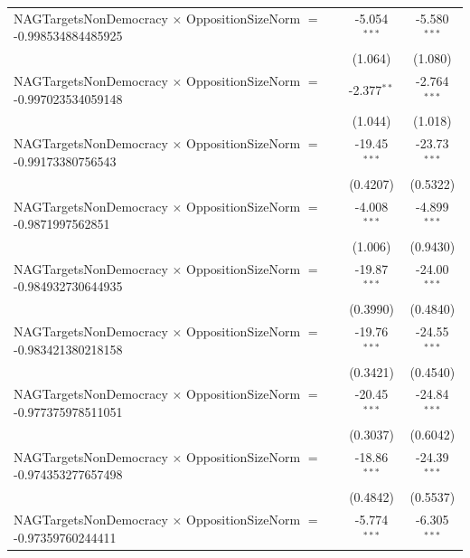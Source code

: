 \begin{tabular}{lcc}
   NAGTargetsNonDemocracy $\times$ OppositionSizeNorm $=$ -0.998534884485925    & -5.054$^{***}$       & -5.580$^{***}$\\   
                                                                                & (1.064)              & (1.080)\\   
   NAGTargetsNonDemocracy $\times$ OppositionSizeNorm $=$ -0.997023534059148    & -2.377$^{**}$        & -2.764$^{***}$\\   
                                                                                & (1.044)              & (1.018)\\   
   NAGTargetsNonDemocracy $\times$ OppositionSizeNorm $=$ -0.99173380756543     & -19.45$^{***}$       & -23.73$^{***}$\\   
                                                                                & (0.4207)             & (0.5322)\\   
   NAGTargetsNonDemocracy $\times$ OppositionSizeNorm $=$ -0.9871997562851      & -4.008$^{***}$       & -4.899$^{***}$\\   
                                                                                & (1.006)              & (0.9430)\\   
   NAGTargetsNonDemocracy $\times$ OppositionSizeNorm $=$ -0.984932730644935    & -19.87$^{***}$       & -24.00$^{***}$\\   
                                                                                & (0.3990)             & (0.4840)\\   
   NAGTargetsNonDemocracy $\times$ OppositionSizeNorm $=$ -0.983421380218158    & -19.76$^{***}$       & -24.55$^{***}$\\   
                                                                                & (0.3421)             & (0.4540)\\   
   NAGTargetsNonDemocracy $\times$ OppositionSizeNorm $=$ -0.977375978511051    & -20.45$^{***}$       & -24.84$^{***}$\\   
                                                                                & (0.3037)             & (0.6042)\\   
   NAGTargetsNonDemocracy $\times$ OppositionSizeNorm $=$ -0.974353277657498    & -18.86$^{***}$       & -24.39$^{***}$\\   
                                                                                & (0.4842)             & (0.5537)\\   
   NAGTargetsNonDemocracy $\times$ OppositionSizeNorm $=$ -0.97359760244411     & -5.774$^{***}$       & -6.305$^{***}$\\   

\end{tabular}

